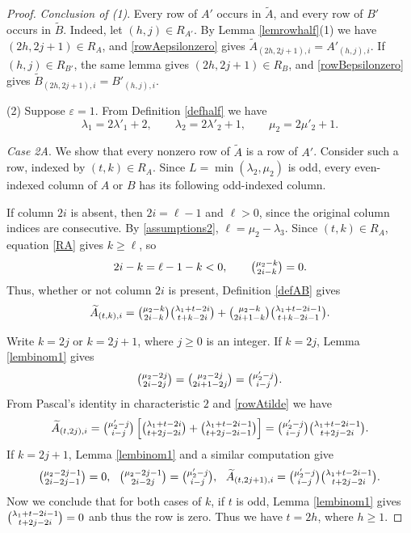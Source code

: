 \documentclass[11pt]{amsart}
\theoremstyle{remark}
\theoremstyle{definition}
\newcommand{\la}{\lambda}
\numberwithin{equation}{section}
\begin{document}
\begin{proof}
	\textit{Conclusion of (1)}. Every row of $A'$ occurs in
	$\widetilde A$, and every row of $B'$ occurs in $\widetilde B$.
	Indeed, let $(h,j)\in R_{A'}$. By Lemma \ref{lemrowhalf}(1) we have
	$(2h,2j+1)\in R_A$, and \eqref{rowAepsilonzero} gives
	$\widetilde A_{(2h,2j+1),i}=A'_{(h,j),i}$.
	If $(h,j)\in R_{B'}$, the same lemma gives
	$(2h,2j+1)\in R_B$, and \eqref{rowBepsilonzero} gives
	$\widetilde B_{(2h,2j+1),i}=B'_{(h,j),i}$.
	
	(2) Suppose $\varepsilon=1$. 	From Definition \ref{defhalf} we have
	\begin{equation}\label{lala'2}
	\la_1=2\la'_1+2,\qquad
	\la_2=2\la'_2+1,\qquad
	\mu_2=2\mu'_2+1.
	\end{equation}
	
	\textit{Case 2A}. We show that every nonzero row of
	$\widetilde A$ is a row of $A'$.
	Consider such a row, indexed by $(t,k)\in R_A$.
	Since $L=\min(\la_2,\mu_2)$ is odd, every even-indexed
	column of $A$ or $B$ has its following odd-indexed column.
	
	If column $2i$ is absent, then $2i=\ell-1$ and $\ell>0$,
	since the original column indices are consecutive.
	By \eqref{assumptions2}, $\ell=\mu_2-\la_3$.
	Since $(t,k)\in R_A$, equation \eqref{RA} gives $k\ge\ell$, so
	\[
	2i-k=\ell-1-k<0,\qquad
	\tbinom{\mu_2-k}{2i-k}=0.
	\]
	Thus, whether or not column $2i$ is present, Definition \ref{defAB}
	gives
	\begin{equation}\label{rowAtilde}
		\widetilde A_{(t,k),i}
		=\tbinom{\mu_2-k}{2i-k}
		\tbinom{\la_1+t-2i}{t+k-2i}+\tbinom{\mu_2-k}{2i+1-k}
		\tbinom{\la_1+t-2i-1}{t+k-2i-1}.
	\end{equation}
	
	Write $k=2j$ or $k=2j+1$, where $j\ge0$ is an integer.
	If $k=2j$, Lemma \ref{lembinom1} gives
	\[
	\tbinom{\mu_2-2j}{2i-2j}
	=\tbinom{\mu_2-2j}{2i+1-2j}
	=\tbinom{\mu'_2-j}{i-j}.
	\]
	From Pascal's identity
	in characteristic $2$ and \eqref{rowAtilde} we have
	\[
		\widetilde A_{(t,2j),i}
		=\tbinom{\mu'_2-j}{i-j}
		\left[
		\tbinom{\la_1+t-2i}{t+2j-2i}
		+\tbinom{\la_1+t-2i-1}{t+2j-2i-1}
		\right]=\tbinom{\mu'_2-j}{i-j}
		\tbinom{\la_1+t-2i-1}{t+2j-2i}.
	\]
	If $k=2j+1$, Lemma \ref{lembinom1} and a similar computation give
	\[
	\begin{gathered}
		\tbinom{\mu_2-2j-1}{2i-2j-1}=0,\ \
		\tbinom{\mu_2-2j-1}{2i-2j}=\tbinom{\mu'_2-j}{i-j},\ \
		\widetilde A_{(t,2j+1),i}
		=\tbinom{\mu'_2-j}{i-j}
		\tbinom{\la_1+t-2i-1}{t+2j-2i}.
	\end{gathered}
	\]
	Now we conclude that for both cases of $k$, if $t$ is odd, Lemma \ref{lembinom1}
	gives
$
	\tbinom{\la_1+t-2i-1}{t+2j-2i}=0
$
	anb thus the row is zero. Thus we have $t=2h$, where $h\ge1$.
	

\end{proof}
\end{document}
